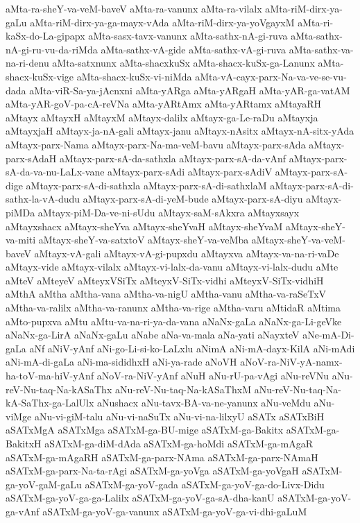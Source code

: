 {aMta-ra-sheY-va-veM-baveV
aMta-ra-vanunx
aMta-ra-vilalx
aMta-riM-dirx-ya-gaLu
aMta-riM-dirx-ya-ga-mayx-vAda
aMta-riM-dirx-ya-yoVgayxM
aMta-ri-kaSx-do-La-gipapx
aMta-sasx-tavx-vanunx
aMta-sathx-nA-gi-ruva
aMta-sathx-nA-gi-ru-vu-da-riMda
aMta-sathx-vA-gide
aMta-sathx-vA-gi-ruva
aMta-sathx-va-na-ri-denu
aMta-satxnunx
aMta-shacxkuSx
aMta-shacx-kuSx-ga-Lanunx
aMta-shacx-kuSx-vige
aMta-shacx-kuSx-vi-niMda
aMta-vA-cayx-parx-Na-va-ve-se-vu-dada
aMta-viR-Sa-ya-jAcnxni
aMta-yARga
aMta-yARgaH
aMta-yAR-ga-vatAM
aMta-yAR-goV-pa-cA-reVNa
aMta-yARtAmx
aMta-yARtamx
aMtayaRH
aMtayx
aMtayxH
aMtayxM
aMtayx-dalilx
aMtayx-ga-Le-raDu
aMtayxja
aMtayxjaH
aMtayx-ja-nA-gali
aMtayx-janu
aMtayx-nAsitx
aMtayx-nA-sitx-yAda
aMtayx-parx-Nama
aMtayx-parx-Na-ma-veM-bavu
aMtayx-parx-sAda
aMtayx-parx-sAdaH
aMtayx-parx-sA-da-sathxla
aMtayx-parx-sA-da-vAnf
aMtayx-parx-sA-da-va-nu-LaLx-vane
aMtayx-parx-sAdi
aMtayx-parx-sAdiV
aMtayx-parx-sA-dige
aMtayx-parx-sA-di-sathxla
aMtayx-parx-sA-di-sathxlaM
aMtayx-parx-sA-di-sathx-la-vA-dudu
aMtayx-parx-sA-di-yeM-bude
aMtayx-parx-sA-diyu
aMtayx-piMDa
aMtayx-piM-Da-ve-ni-sUdu
aMtayx-saM-sAkxra
aMtayxsayx
aMtayxshacx
aMtayx-sheYva
aMtayx-sheYvaH
aMtayx-sheYvaM
aMtayx-sheY-va-miti
aMtayx-sheY-va-satxtoV
aMtayx-sheY-va-veMba
aMtayx-sheY-va-veM-baveV
aMtayx-vA-gali
aMtayx-vA-gi-pupxdu
aMtayxva
aMtayx-va-na-ri-vaDe
aMtayx-vide
aMtayx-vilalx
aMtayx-vi-lalx-da-vanu
aMtayx-vi-lalx-dudu
aMte
aMteV
aMteyeV
aMteyxVSiTx
aMteyxV-SiTx-vidhi
aMteyxV-SiTx-vidhiH
aMthA
aMtha
aMtha-vana
aMtha-va-nigU
aMtha-vanu
aMtha-va-raSeTxV
aMtha-va-ralilx
aMtha-va-ranunx
aMtha-va-rige
aMtha-varu
aMtidaR
aMtima
aMto-pupxva
aMtu
aMtu-va-na-ri-ya-da-vana
aNaNx-gaLa
aNaNx-ga-Li-geVke
aNaNx-ga-LirA
aNaNx-gaLu
aNabe
aNa-va-mala
aNa-yati
aNayxteV
aNe-mA-Di-gaLa
aNf
aNiV-yAnf
aNi-go-Li-si-ko-LaLxlu
aNimA
aNi-mA-dayx-KilA
aNi-mAdi
aNi-mA-di-gaLa
aNi-ma-sididhxH
aNi-ya-rade
aNoVH
aNoV-ra-NiV-yA-namx-ha-toV-ma-hiV-yAnf
aNoV-ra-NiV-yAnf
aNuH
aNu-rU-pa-vAgi
aNu-reVNu
aNu-reV-Nu-taq-Na-kASaThx
aNu-reV-Nu-taq-Na-kASaThxM
aNu-reV-Nu-taq-Na-kA-SaThx-ga-LalUlx
aNushacx
aNu-tavx-BA-va-ne-yanunx
aNu-veMdu
aNu-viMge
aNu-vi-giM-talu
aNu-vi-naSuTx
aNu-vi-na-lilxyU
aSATx
aSATxBiH
aSATxMgA
aSATxMga
aSATxM-ga-BU-mige
aSATxM-ga-Bakitx
aSATxM-ga-BakitxH
aSATxM-ga-diM-dAda
aSATxM-ga-hoMdi
aSATxM-ga-mAgaR
aSATxM-ga-mAgaRH
aSATxM-ga-parx-NAma
aSATxM-ga-parx-NAmaH
aSATxM-ga-parx-Na-ta-rAgi
aSATxM-ga-yoVga
aSATxM-ga-yoVgaH
aSATxM-ga-yoV-gaM-gaLu
aSATxM-ga-yoV-gada
aSATxM-ga-yoV-ga-do-Livx-Didu
aSATxM-ga-yoV-ga-ga-Lalilx
aSATxM-ga-yoV-ga-sA-dha-kanU
aSATxM-ga-yoV-ga-vAnf
aSATxM-ga-yoV-ga-vanunx
aSATxM-ga-yoV-ga-vi-dhi-gaLuM
}
